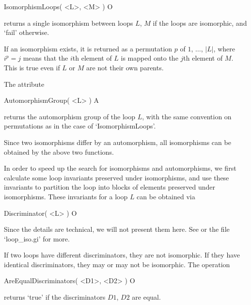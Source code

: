 \>IsomorphismLoops( <L>, <M> ) O

returns a single isomorphism between loops $L$, $M$ if the loops are
isomorphic, and `fail' otherwise.

If an isomorphism exists, it is returned as a permutation $p$ of $1$, $\dots$,
$|L|$, where $i^p=j$ means that the $i$th element of $L$ is mapped onto the
$j$th element of $M$. This is true even if $L$ or $M$ are not their own
parents.

The attribute

\>AutomorphismGroup( <L> ) A

returns the automorphism group of the loop $L$, with the same convention on
permutations as in the case of `IsomorphismLoops'.

Since two isomorphisms differ by an automorphism, all isomorphisms can be
obtained by the above two functions.


In order to speed up the search for isomorphisms and automorphisms, we first
calculate some loop invariants preserved under isomorphisms, and use these
invariants to partition the loop into blocks of elements preserved under
isomorphisms. These invariants for a loop $L$ can be obtained via

\>Discriminator( <L> ) O

Since the details are technical, we will not present them here. See
\cite{VoEJC} or the file `loop_iso.gi' for more.

If two loops have different discriminators, they are not isomorphic. If they
have identical discriminators, they may or may not be isomorphic. The operation

\>AreEqualDiscriminators( <D1>, <D2> ) O

returns `true' if the discriminators $D1$, $D2$ are equal.

